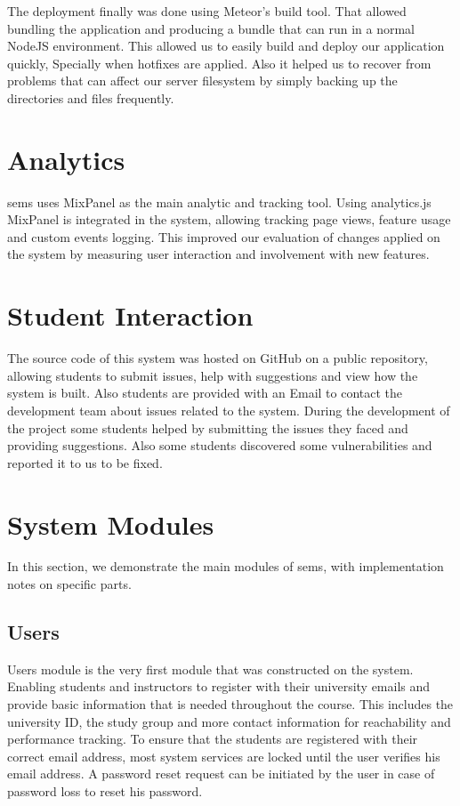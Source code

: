 \newParagraph
The deployment finally was done using Meteor's build tool. That allowed bundling the application and producing a bundle that can run
in a normal NodeJS environment. This allowed us to easily build and deploy our application quickly, Specially when hotfixes are applied.
Also it helped us to recover from problems that can affect our server filesystem by simply backing up the directories and files frequently.

\section{Analytics}
\label{sec:analytics}

\ac{sems} uses MixPanel\texttrademark{} as the main analytic and tracking tool. Using analytics.js~\cite{analytics_js} MixPanel\texttrademark{} is
integrated in the system, allowing tracking page views, feature usage and custom events logging. This improved our evaluation of changes applied on the
system by measuring user interaction and involvement with new features.

\section{Student Interaction}
\label{sec:student-interaction}
The source code of this system was hosted on GitHub\texttrademark{} on a public repository, allowing students to submit issues, help with
suggestions and view how the system is built. Also students are provided with an Email to contact the development team about issues related
to the system. During the development of the project some students helped by submitting the issues they faced and providing suggestions. Also
some students discovered some vulnerabilities and reported it to us to be fixed.

\section{System Modules}
\label{sec:modules}

In this section, we demonstrate the main modules of \ac{sems}, with implementation notes on specific parts.

\subsection{Users}
\label{sub:users}
Users module is the very first module that was constructed on the system. Enabling students and instructors to register with their
university emails and provide basic information that is needed throughout the course. This includes the university ID, the study group
and more contact information for reachability and performance tracking. To ensure that the students are registered with their correct email
address, most system services are locked until the user verifies his email address. A password reset request can be initiated by the user
in case of password loss to reset his password.

